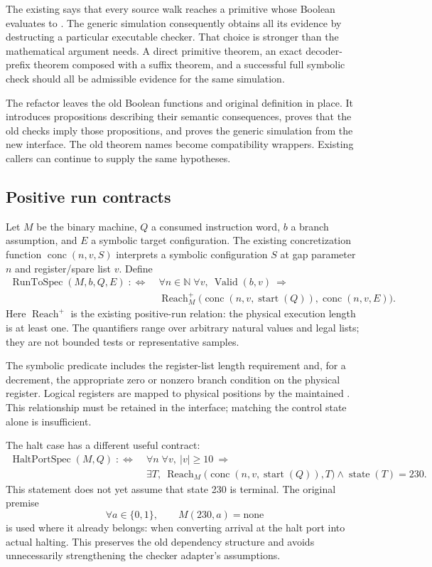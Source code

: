 \documentclass[11pt,letterpaper]{article}
\theoremstyle{definition}\newtheorem{definition}[theorem]{Definition}
\theoremstyle{remark}\newtheorem{remark}[theorem]{Remark}
\newcommand{\code}[1]{\texttt{\detokenize{#1}}}
\newcommand{\Reach}{\operatorname{Reach}}
\newcommand{\Valid}{\operatorname{Valid}}
\newcommand{\Conc}{\operatorname{conc}}
\newcommand{\Start}{\operatorname{start}}
\begin{document}
The existing \code{Covered M p} says that every source walk reaches a primitive whose Boolean \code{checkEdge M Q e} evaluates to \code{true}. The generic simulation consequently obtains all its evidence by destructing a particular executable checker. That choice is stronger than the mathematical argument needs. A direct primitive theorem, an exact decoder-prefix theorem composed with a suffix theorem, and a successful full symbolic check should all be admissible evidence for the same simulation.

The refactor leaves the old Boolean functions and original \code{Covered} definition in place. It introduces propositions describing their semantic consequences, proves that the old checks imply those propositions, and proves the generic simulation from the new interface. The old theorem names become compatibility wrappers. Existing callers can continue to supply the same hypotheses.

\subsection{Positive run contracts}

Let $M$ be the binary machine, $Q$ a consumed instruction word, $b$ a branch assumption, and $E$ a symbolic target configuration. The existing concretization function $\Conc(n,v,S)$ interprets a symbolic configuration $S$ at gap parameter $n$ and register/spare list $v$. Define
\begin{align*}
\operatorname{RunToSpec}(M,b,Q,E)\;:\Longleftrightarrow\;&
\forall n\in\mathbb N\;\forall v,\ \Valid(b,v)\ \Longrightarrow\\[-2pt]
&\Reach_M^+\bigl(\Conc(n,v,\Start(Q)),\Conc(n,v,E)\bigr).
\end{align*}
Here $\Reach^+$ is the existing positive-run relation: the physical execution length is at least one. The quantifiers range over arbitrary natural values and legal lists; they are not bounded tests or representative samples.

The symbolic \code{Valid} predicate includes the register-list length requirement and, for a decrement, the appropriate zero or nonzero branch condition on the physical register. Logical registers are mapped to physical positions by the maintained \code{physOf}. This relationship must be retained in the interface; matching the control state alone is insufficient.

The halt case has a different useful contract:
\begin{align*}
\operatorname{HaltPortSpec}(M,Q)\;:\Longleftrightarrow\;&
\forall n\;\forall v,\ |v|\geq 10\ \Longrightarrow\\[-2pt]
&\exists T,\ \Reach_M\bigl(\Conc(n,v,\Start(Q)),T\bigr)
\land \operatorname{state}(T)=230.
\end{align*}
This statement does not yet assume that state 230 is terminal. The original premise
\[
\forall a\in\{0,1\},\qquad M(230,a)=\mathrm{none}
\]
is used where it already belongs: when converting arrival at the halt port into actual halting. This preserves the old dependency structure and avoids unnecessarily strengthening the checker adapter's assumptions.
\end{document}
